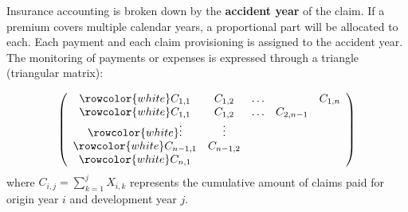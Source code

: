 \begin{f}
	
	Insurance accounting is broken down by the \textbf{accident year} of the claim. 
	If a premium covers multiple calendar years, a proportional part will be allocated to each.
	Each payment and each claim provisioning is assigned to the accident year. 
	The monitoring of payments or expenses is expressed through a triangle (triangular matrix):
	
	$$
	\left(\begin{array}{ccccc}
		\rowcolor{white}	C_{1,1} & C_{1,2} & \ldots & & C_{1, n} \\
		\rowcolor{white}	C_{1,1} & C_{1,2} & \ldots & C_{2, n-1} \\
		\rowcolor{white}	\vdots & \vdots & & \\
		\rowcolor{white}	C_{n-1,1} & C_{n-1,2} & & \\
		\rowcolor{white}	C_{n, 1} & & &
	\end{array}\right)
	$$
	where $C_{i, j}=\sum_{k=1}^{j} X_{i, k}$ represents the cumulative amount of claims paid for origin year $i$ and development year $j$.
	
\end{f}


